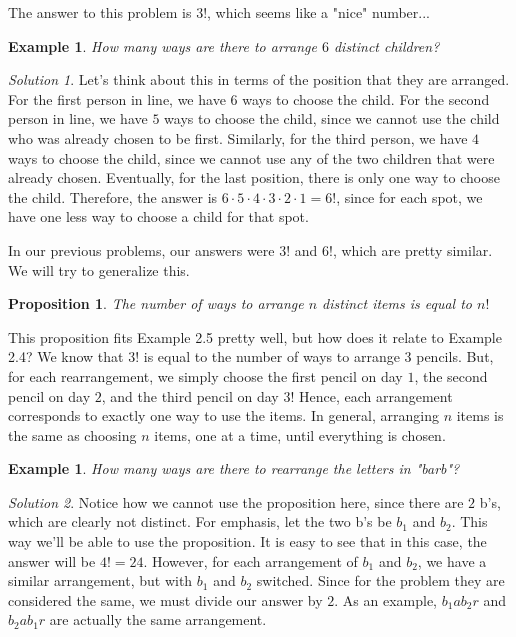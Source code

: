 \documentclass[letterpaper]{article}
\newtheorem{prop}[thm]{Proposition}
\newtheorem{example}[thm]{Example}
\theoremstyle{remark}
\newtheorem*{solution}{Solution}
\theoremstyle{definition}
\begin{document}
The answer to this problem is $3!$, which seems like a "nice" number...

\begin{example}
How many ways are there to arrange $6$ distinct children?
\end{example}

\begin{solution}
Let's think about this in terms of the position that they are arranged. For the first person in line, we have $6$ ways to choose the child. For the second person in line, we have $5$ ways to choose the child, since we cannot use the child who was already chosen to be first. Similarly, for the third person, we have $4$ ways to choose the child, since we cannot use any of the two children that were already chosen. Eventually, for the last position, there is only one way to choose the child. Therefore, the answer is $6\cdot 5\cdot 4\cdot 3\cdot 2\cdot 1=6!$, since for each spot, we have one less way to choose a child for that spot.
\end{solution}

In our previous problems, our answers were $3!$ and $6!$, which are pretty similar. We will try to generalize this.

\bigskip

\begin{mdframed}
\begin{prop}
The number of ways to arrange $n$ distinct items is equal to $n!$
\end{prop}
\end{mdframed}

This proposition fits Example 2.5 pretty well, but how does it relate to Example 2.4? We know that $3!$ is equal to the number of ways to arrange $3$ pencils. But, for each rearrangement, we simply choose the first pencil on day $1$, the second pencil on day $2$, and the third pencil on day $3$! Hence, each arrangement corresponds to exactly one way to use the items. In general, arranging $n$ items is the same as choosing $n$ items, one at a time, until everything is chosen.

\bigskip


\begin{example}
How many ways are there to rearrange the letters in "barb"?
\end{example}

\begin{solution}
Notice how we cannot use the proposition here, since there are $2$ b's, which are clearly not distinct. For emphasis, let the two b's be $b_1$ and $b_2$. This way we'll be able to use the proposition. It is easy to see that in this case, the answer will be $4!=24$. However, for each arrangement of $b_1$ and $b_2$, we have a similar arrangement, but with $b_1$ and $b_2$ switched. Since for the problem they are considered the same, we must divide our answer by $2$. As an example, $b_1 a b_2 r$ and $b_2 a b_1 r$ are actually the same arrangement.
\end{solution}
\end{document}
